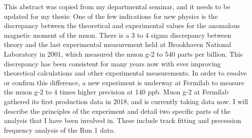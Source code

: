 

This abstract was copied from my departmental seminar, and it needs to be updated for my thesis: One of the few indications for new physics is the discrepancy between the theoretical and experimental values for the anomalous magnetic moment of the muon. There is a 3 to 4 sigma discrepancy between theory and the last experimental measurement held at Brookhaven National Laboratory in 2001, which measured the muon g-2 to 540 parts per billion. This discrepancy has been consistent for many years now with ever improving theoretical calculations and other experimental measurements. In order to resolve or confirm this difference, a new experiment is underway at Fermilab to measure the muon g-2 to 4 times higher precision at 140 ppb. Muon g-2 at Fermilab gathered its first production data in 2018, and is currently taking data now. I will describe the principles of the experiment and detail two specific parts of the analysis that I have been involved in. These include track fitting and precession frequency analysis of the Run 1 data.
